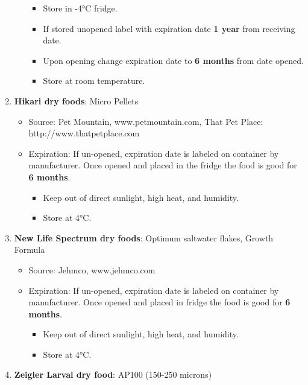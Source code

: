 \documentclass[
  letterpaper,
  DIV=11,
  numbers=noendperiod]{scrreprt}
\providecommand{\tightlist}{%
  \setlength{\itemsep}{0pt}\setlength{\parskip}{0pt}}\usepackage{longtable,booktabs,array}
\begin{document}
\begin{enumerate}
\begin{itemize}
    \begin{itemize}
    \tightlist
    \item
      Store in -4°C fridge.
    \item
      If stored unopened label with expiration date \textbf{1 year} from
      receiving date.
    \item
      Upon opening change expiration date to \textbf{6 months} from date
      opened.
    \item
      Store at room temperature.
    \end{itemize}
  \end{itemize}
\item
  \textbf{Hikari dry foods}: Micro Pellets

  \begin{itemize}
  \tightlist
  \item
    Source: Pet Mountain, www.petmountain.com, That Pet Place:
    http://www.thatpetplace.com
  \item
    Expiration: If un-opened, expiration date is labeled on container by
    manufacturer. Once opened and placed in the fridge the food is good
    for \textbf{6 months}.

    \begin{itemize}
    \tightlist
    \item
      Keep out of direct sunlight, high heat, and humidity.
    \item
      Store at 4°C.
    \end{itemize}
  \end{itemize}
\item
  \textbf{New Life Spectrum dry foods}: Optimum saltwater flakes, Growth
  Formula

  \begin{itemize}
  \tightlist
  \item
    Source: Jehmco, www.jehmco.com
  \item
    Expiration: If un-opened, expiration date is labeled on container by
    manufacturer. Once opened and placed in fridge the food is good for
    \textbf{6 months}.

    \begin{itemize}
    \tightlist
    \item
      Keep out of direct sunlight, high heat, and humidity.
    \item
      Store at 4°C.
    \end{itemize}
  \end{itemize}
\item
  \textbf{Zeigler Larval dry food}: AP100 (150-250 microns)


\end{enumerate}
\end{document}
